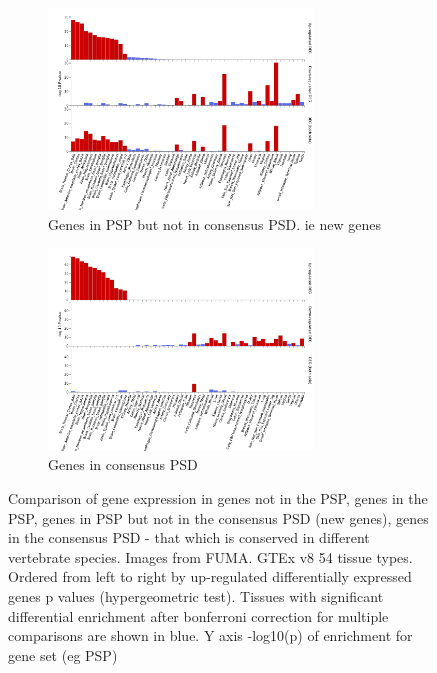 \begin{figure}
  \begin{subfigure}{8cm}
    \centering\includegraphics[width=7cm]{images/FUMA_plots/gtex_v8_ts_psp_not_consensus_FUMA_gene2func44650.png}
    \caption{Genes in PSP but not in consensus PSD. ie new genes}
  \end{subfigure}
  \begin{subfigure}{8cm}
    \centering\includegraphics[width=7cm]{images/FUMA_plots/gtex_v8_ts_1313_consensus_FUMA_gene2func44650.png}
    \caption{Genes in consensus PSD}
  \end{subfigure}
  \caption[\textbf{Comparison of gene expression} in consensus PSD and PSP]{Comparison of gene expression in genes not in the PSP, genes in the PSP, genes in PSP but not in the consensus PSD (new genes), genes in the consensus PSD - that which is conserved in different vertebrate species. Images from FUMA. GTEx v8 54 tissue types. Ordered from left to right by up-regulated differentially expressed genes p values (hypergeometric test). Tissues with significant differential enrichment after bonferroni correction for multiple comparisons are shown in blue. Y axis -log10(p) of enrichment for gene set (eg PSP) }
  \label{fig:compare all PSP gtex multipanel FUMA output}
\end{figure}

 
 






